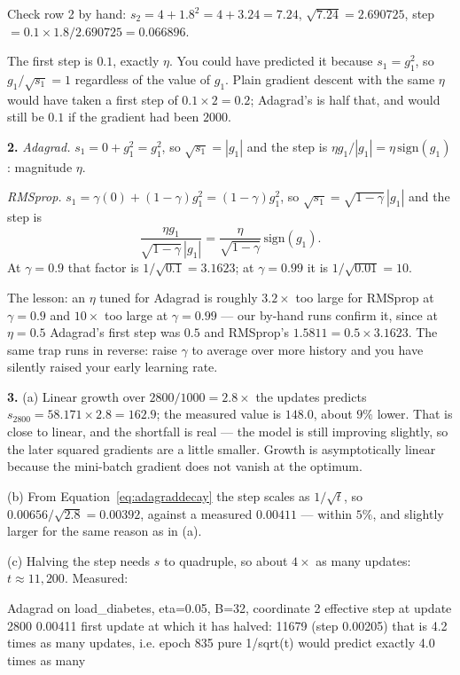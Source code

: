 \documentclass[11pt]{article}
\begin{document}
Check row 2 by hand: $s_2 = 4 + 1.8^2 = 4 + 3.24 = 7.24$, $\sqrt{7.24} =
2.690725$, step $= 0.1 \times 1.8/2.690725 = 0.066896$.

The first step is $0.1$, exactly $\eta$. You could have predicted it because
$s_1 = g_1^2$, so $g_1/\sqrt{s_1} = 1$ regardless of the value of $g_1$. Plain
gradient descent with the same $\eta$ would have taken a first step of
$0.1 \times 2 = 0.2$; Adagrad's is half that, and would still be $0.1$ if the
gradient had been $2000$.

\medskip
\textbf{2.} \emph{Adagrad.} $s_1 = 0 + g_1^2 = g_1^2$, so
$\sqrt{s_1} = |g_1|$ and the step is
$\eta g_1/|g_1| = \eta\,\mathrm{sign}(g_1)$: magnitude $\eta$.

\emph{RMSprop.} $s_1 = \gamma(0) + (1-\gamma)g_1^2 = (1-\gamma)g_1^2$, so
$\sqrt{s_1} = \sqrt{1-\gamma}\,|g_1|$ and the step is
\[
  \frac{\eta g_1}{\sqrt{1-\gamma}\,|g_1|}
  = \frac{\eta}{\sqrt{1-\gamma}}\,\mathrm{sign}(g_1).
\]
At $\gamma = 0.9$ that factor is $1/\sqrt{0.1} = 3.1623$; at $\gamma = 0.99$ it
is $1/\sqrt{0.01} = 10$.

The lesson: an $\eta$ tuned for Adagrad is roughly $3.2\times$ too large for
RMSprop at $\gamma = 0.9$ and $10\times$ too large at $\gamma = 0.99$ --- our
by-hand runs confirm it, since at $\eta = 0.5$ Adagrad's first step was $0.5$
and RMSprop's $1.5811 = 0.5 \times 3.1623$. The same trap runs in reverse:
raise $\gamma$ to average over more history and you have silently raised your
early learning rate.

\medskip
\textbf{3.} (a) Linear growth over $2800/1000 = 2.8\times$ the updates predicts
$s_{2800} = 58.171 \times 2.8 = 162.9$; the measured value is $148.0$, about
$9\%$ lower. That is close to linear, and the shortfall is real --- the model is
still improving slightly, so the later squared gradients are a little smaller.
Growth is asymptotically linear because the mini-batch gradient does not vanish
at the optimum.

(b) From Equation~\eqref{eq:adagraddecay} the step scales as $1/\sqrt{t}$, so
$0.00656/\sqrt{2.8} = 0.00392$, against a measured $0.00411$ --- within $5\%$,
and slightly larger for the same reason as in (a).

(c) Halving the step needs $s$ to quadruple, so about $4\times$ as many
updates: $t \approx 11{,}200$. Measured:

\begin{codeout}
Adagrad on load_diabetes, eta=0.05, B=32, coordinate 2
   effective step at update  2800   0.00411
   first update at which it has halved: 11679  (step 0.00205)
   that is 4.2 times as many updates, i.e. epoch 835
   pure 1/sqrt(t) would predict exactly 4.0 times as many
\end{codeout}
\end{document}
